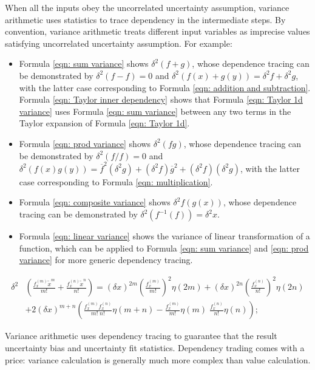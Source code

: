 \documentclass[twoside]{article}
\numberwithin{equation}{section}
\begin{document}
When all the inputs obey the uncorrelated uncertainty assumption, variance arithmetic uses statistics to trace dependency in the intermediate steps.
By convention, variance arithmetic treats different input variables as imprecise values satisfying uncorrelated uncertainty assumption.
For example:
\begin{itemize}
\item Formula \eqref{eqn: sum variance} shows $\delta^2 (f + g)$, whose dependence tracing can be demonstrated by $\delta^2 (f - f) = 0$  and $\delta^2 (f(x) + g(y)) = \delta^2 f + \delta^2 g$, with the latter case corresponding to Formula \eqref{eqn: addition and subtraction}.   Formula \eqref{eqn: Taylor inner dependency} shows that Formula \eqref{eqn: Taylor 1d variance} uses Formula \eqref{eqn: sum variance} between any two terms in the Taylor expansion of Formula \eqref{eqn: Taylor 1d}.

\item Formula \eqref{eqn: prod variance} shows  $\delta^2 (f g)$, whose dependence tracing can be demonstrated by $\delta^2 (f/f) = 0$  and $\delta^2 (f(x) g(y)) = \overline{f}^2 (\delta^2 g) + (\delta^2 f) \overline{g}^2 +  (\delta^2 f) (\delta^2 g)$, with the latter case corresponding to Formula \eqref{eqn: multiplication}.  

\item Formula \eqref{eqn: composite variance} shows  $\delta^2 f(g(x))$, whose dependence tracing can be demonstrated by $\delta^2 (f^{-1}(f)) = \delta^2 x$.  

\item Formula \eqref{eqn: linear variance} shows the variance of linear transformation of a function, which can be applied to Formula \eqref{eqn: sum variance} and \eqref{eqn: prod variance} for more generic dependency tracing.
\end{itemize}
\begin{align}
\label{eqn: Taylor inner dependency}
\delta^2 & \left( \frac{f^{(m)}_x \tilde{x}^m}{m!} + \frac{f^{(n)}_x \tilde{x}^n}{n!} \right) = 
    (\delta x)^{2m} (\frac{f^{(m)}_x }{m!})^2 \eta(2m) + (\delta x)^{2n} (\frac{f^{(n)}_x }{n!})^2 \eta(2n) \\
  &+ 2 (\delta x)^{m+n} \left( \frac{f^{(m)}_x f^{(n)}_x}{m! \;n!} \eta(m+n) 	- \frac{f^{(m)}_x}{m!} \eta(m) \;\frac{f^{(n)}_x}{n!}  \eta(n) \right);  \nonumber
\end{align}

Variance arithmetic uses dependency tracing to guarantee that the result uncertainty bias and uncertainty fit statistics.
Dependency trading comes with a price: variance calculation is generally much more complex than value calculation.
\end{document}
